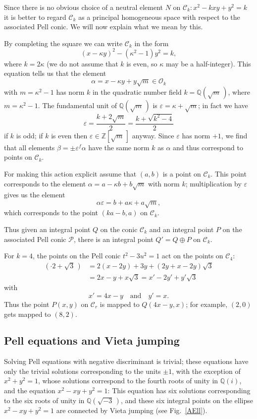 \documentclass{amsart}
\newcommand{\Z}{{\mathbb Z}}
\newcommand{\Q}{{\mathbb Q}}
\newcommand{\eps}{\varepsilon}
\newcommand{\cC}{{\mathcal C}}
\newcommand{\cO}{{\mathcal O}}
\newcommand{\cP}{{\mathcal P}}
\begin{document}
Since there is no obvious choice of a neutral element $N$ on
$\cC_k: x^2 - kxy + y^2 = k$ it is better to regard $\cC_k$ as
a principal homogeneous space with respect to the associated Pell conic.
We will now explain what we mean by this.

By completing the square we can write $\cC_k$ in the form
$$ (x - \kappa y)^2 - (\kappa^2-1)y^2 = k, $$
where $k = 2\kappa$ (we do not assume that $k$ is even, so $\kappa$
may be a half-integer). This equation tells us that the element
$$ \alpha = x-\kappa y + y\sqrt{m} \in \cO_k $$
with $m = \kappa^2 - 1$ has norm $k$ in the quadratic number field
$k = \Q(\sqrt{m}\,)$, where $m = \kappa^2-1$. The fundamental unit
of $\Q(\sqrt{m}\,)$ is $\eps = \kappa + \sqrt{m}$; in fact we have
$$ \eps = \frac{k + 2 \sqrt{m}}2 = \frac{k + \sqrt{k^2-4}}2 $$
if $k$ is odd; if $k$ is even then $\eps \in \Z[\sqrt{m}\,]$ anyway.
Since $\eps$ has norm $+1$, we find that all elements
$\beta = \pm \eps^f \alpha$ have the same norm $k$ as $\alpha$ and
thus correspond to points on $\cC_k$.

For making this action explicit assume that $(a,b)$ is a point on $\cC_k$.
This point corresponds to the element $\alpha = a - \kappa b + b\sqrt{m}$
with norm $k$; multiplication by $\eps$ gives us the element
$$ \alpha \eps = b + a \kappa + a\sqrt{m}, $$
which corresponds to the point $(ka-b,a)$ on $\cC_k$.

Thus given an integral point $Q$ on the conic $\cC_k$ and an integral
point $P$ on the associated Pell conic $\cP$, there is an integral point
$Q' = Q \oplus P$ on $\cC_k$.


\medskip{}
For $k = 4$, the points on the Pell conic $t^2 - 3u^2 = 1$ act on the
points on $\cC_4$:
\begin{align*}
  [(x-2y) + y\sqrt{3} \,] (\cdot 2 + \sqrt{3}\,)
    & = 2(x-2y) + 3y + (2y+x-2y) \sqrt{3} \\
    & = 2x - y + x \sqrt{3} = x' - 2y' + y' \sqrt{3} 
\end{align*}
with
$$ x' = 4x-y \quad \text{and} \quad y' = x. $$
Thus the point $P(x, y)$ on $\cC_r$ is mapped to $Q(4x-y,x)$;
for example, $(2,0)$ gets mapped to $(8,2)$.

\subsection*{Pell equations and Vieta jumping}


Solving Pell equations with negative discriminant is trivial;
these equations have only the trivial solutions corresponding to the
units $\pm 1$, with the exception of $x^2 + y^2 = 1$, whose solutions
correspond to the fourth roots of unity in $\Q(i)$, and the
equation $x^2 - xy + y^2 = 1$: This equation has six solutions
corresponding to the six roots of unity in $\Q(\sqrt{-3}\,)$,
and these six integral points on the ellipse $x^2 - xy + y^2 = 1$
are connected by Vieta jumping (see Fig.~\ref{AEll}).
\end{document}
